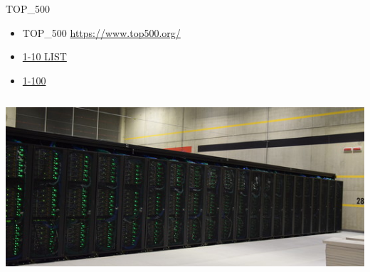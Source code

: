 \documentclass[ignorenonframetext,]{beamer}
\providecommand{\tightlist}{%
  \setlength{\itemsep}{0pt}\setlength{\parskip}{0pt}}
\begin{document}
\begin{frame}[fragile]{TOP\_500}

\begin{itemize}
\tightlist
\item
  TOP\_500 \url{https://www.top500.org/}
\item
  \href{https://www.top500.org/lists/2018/11/}{1-10 LIST}
\item
  \href{https://www.top500.org/list/2018/11/?page=1}{1-100}
\end{itemize}

\begin{verbatim}
\end{verbatim}

\href{https://www.eni.com/it_IT/innovazione/piattaforme-tecnologiche/aumento-recupero-idrocarburi/hpc.page}{\includegraphics{images/HPC4-ENI.jpg}}

\end{frame}
\end{document}
